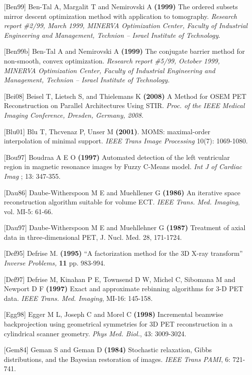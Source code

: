 \documentclass{article}
\begin{document}
{[}Ben99] Ben-Tal A, Margalit T and Nemirovski A \textbf{(1999)} The 
ordered subsets mirror descent optimization method with application 
to tomography. \textit{Research report \#2/99, March 1999, MINERVA 
Optimization Center, Faculty of Industrial Engineering and Management, 
Technion -- Israel Institute of Technology}.

{[}Ben99b] Ben-Tal A and Nemirovski A \textbf{(1999)} The conjugate 
barrier method for non-smooth, convex optimization. \textit{Research 
report \#5/99, October 1999, MINERVA Optimization Center, Faculty 
of Industrial Engineering and Management, Technion -- Israel Institute 
of Technology.}

[Bei08] Beisel T, Lietsch S, and Thielemans K \textbf{(2008)}
A Method for OSEM PET Reconstruction on Parallel Architectures Using STIR.
\textit{Proc. of the IEEE Medical Imaging Conference, Dresden, Germany, 2008}.

{[}Blu01] Blu T, Thcvenaz P, Unser M \textbf{(2001)}. MOMS: maximal-order interpolation of minimal support.  \textit{IEEE Trans Image Processing} 10(7): 1069-1080.

{[}Bou97] Boudraa \textsc{A E O} \textbf{(1997)} Automated detection of the 
left ventricular region in magnetic resonance images by Fuzzy 
C-Means model. \textit{Int J of Cardiac Imag} ; 13: 347-355.

{[}Dau86] Daube-Witherspoon M E and Muehllener G \textbf{(1986)} An 
iterative space reconstruction algorithm suitable for volume 
ECT. \textit{IEEE Trans. Med. Imaging}, vol. MI-5: 61-66.

{[}Dau97] Daube-Witherspoon M E and Muehllehner G \textbf{(1987)} 
Treatment of axial data in three-dimensional PET, 
J. Nucl. Med. 28, 171-1724.

{[}Def95] Defrise M. \textbf{(1995)} ``A factorization method for the 
3D X-ray transform'' \textit{Inverse Problems,} \textbf{11} pp. 983-994.


{[}Def97] Defrise M, Kinahan P E, Townsend D W, Michel C, Sibomana 
M and Newport D F \textbf{(1997)} Exact and approximate rebinning 
algorithms for 3-D PET data. \textit{IEEE Trans. Med. Imaging}, MI-16: 
145-158.

{[}Egg98] Egger M L, Joseph C and Morel C \textbf{(1998)} Incremental 
beamwise backprojection using geometrical symmetries for 3D PET 
reconstruction in a cylindrical scanner geometry. \textit{Phys Med. 
Biol.}, 43: 3009-3024.


{[}Gem84] Geman S and Geman D \textbf{(1984)} Stochastic relaxation, 
Gibbs distributions, and the Bayesian restoration of images. \textit{IEEE 
Trans PAMI}, 6: 721-741.
\end{document}
